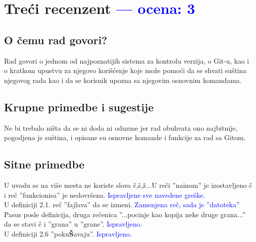 \documentclass[a4paper]{report}
\newcommand{\odgovor}[1]{\textcolor{blue}{#1}}
\begin{document}
\chapter{Treći recenzent \odgovor{--- ocena: 3} }

\section{O čemu rad govori?}
Rad govori o jednom od najpoznatijih sistema za kontrolu verzija, o Git-u, kao i o kratkom upustvu za njegovo korišćenje koje može pomoći da se shvati suština njegovog rada kao i da se korisnik upozna sa njegovim osnovnim komandama.

\section{Krupne primedbe i sugestije}
Ne bi trebalo ništa da se ni doda ni oduzme jer rad obuhvata ono najbitnije, pogodjena je suština, i opisane su osnovne komande i funkcije za rad sa Gitom.


\section{Sitne primedbe}
U uvodu se na više mesta ne koriste slova č,š,ž...U reči ''nainom'' je izostavljeno č i reč ''funkcionisa'' je nedovršena.\newline
\odgovor{Ispravljene sve navedene greške.}\\

U definiciji 2.1. reč ''fajlava'' da se izmeni.\newline
\odgovor{Zamenjena reč, sada je ''datoteka''}\\

Pasus posle definicija, druga rečenica ''...pocinje kao kopija neke druge grana...'' da se stavi č i ''grana'' u ''grane''.\newline
\odgovor{Ispravljeno.}\\

U definiciji 2.6 ''poku\textbf{Š}avaju''.\newline
\odgovor{Ispravljeno.}\\
\end{document}
